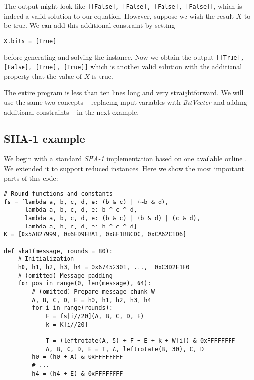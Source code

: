 The output might look like \texttt{[[False], [False], [False], [False]]}, which is indeed a valid solution to our equation.
However, suppose we wish the result $X$ to be true.
We can add this additional constraint by setting

\begin{verbatim}
X.bits = [True]
\end{verbatim}

before generating and solving the instance.
Now we obtain the output \texttt{[[True], [False], [True], [True]]} which is another valid solution with the additional property that the value of $X$ is true.

The entire program is less than ten lines long and very straightforward.
We will use the same two concepts -- replacing input variables with \emph{BitVector} and adding additional constraints -- in the next example.

\subsection{SHA-1 example}
We begin with a standard \emph{SHA-1} implementation based on one available online \cite{alt2013sha1}.
We extended it to support reduced instances.
Here we show the most important parts of this code:

\begin{verbatim}
# Round functions and constants
fs = [lambda a, b, c, d, e: (b & c) | (~b & d),
      lambda a, b, c, d, e: b ^ c ^ d,
      lambda a, b, c, d, e: (b & c) | (b & d) | (c & d),
      lambda a, b, c, d, e: b ^ c ^ d]
K = [0x5A827999, 0x6ED9EBA1, 0x8F1BBCDC, 0xCA62C1D6]

def sha1(message, rounds = 80):
    # Initialization
    h0, h1, h2, h3, h4 = 0x67452301, ...,  0xC3D2E1F0
    # (omitted) Message padding
    for pos in range(0, len(message), 64):
        # (omitted) Prepare message chunk W
        A, B, C, D, E = h0, h1, h2, h3, h4
        for i in range(rounds):
            F = fs[i//20](A, B, C, D, E)
            k = K[i//20]

            T = (leftrotate(A, 5) + F + E + k + W[i]) & 0xFFFFFFFF
            A, B, C, D, E = T, A, leftrotate(B, 30), C, D
        h0 = (h0 + A) & 0xFFFFFFFF
        # ...        
        h4 = (h4 + E) & 0xFFFFFFFF
\end{verbatim}

